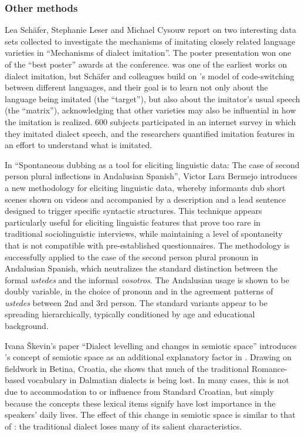 \documentclass[output=paper]{LSP/langsci}
\begin{document}
\subsubsection{Other methods}
Lea Schäfer, Stephanie Leser and Michael Cysouw report on two interesting data sets collected to investigate the mechanisms of imitating closely related language varieties in “Mechanisms of dialect imitation”. The poster presentation won one of the “best poster” awards at the conference. \citet{purschke_regionalsprache_2011} was one of the earliest works on dialect imitation, but Schäfer and colleagues build on \citeauthor{myers-scotton_duelling_1993}'s \citeyearpar{myers-scotton_duelling_1993} model of code-switching between different languages, and their goal is to learn not only about the language being imitated (the “target”), but also about the imitator’s usual speech (the “matrix”), acknowledging that other varieties may also be influential in how the imitation is realized. 600 subjects participated in an internet survey in which they imitated dialect speech, and the researchers quantified imitation features in an effort to understand what is imitated.

In “Spontaneous dubbing as a tool for eliciting linguistic data: The case of second person plural inflections in Andalusian Spanish”, Victor Lara Bermejo introduces a new methodology for eliciting linguistic data, whereby informants dub short scenes shown on videos and accompanied by a description and a lead sentence designed to trigger specific syntactic structures. This technique appears particularly useful for eliciting linguistic features that prove too rare in traditional sociolinguistic interviews, while maintaining a level of spontaneity that is not compatible with pre-established questionnaires. The methodology is successfully applied to the case of the second person plural pronoun in Andalusian Spanish, which neutralizes the standard distinction between the formal \textit{ustedes} and the informal \textit{vosotros}. The Andalusian usage is shown to be doubly variable, in the choice of pronoun and in the agreement patterns of \textit{ustedes} between 2nd and 3rd person. The standard variants appear to be spreading hierarchically, typically conditioned by age and educational background. 

Ivana Škevin’s paper “Dialect levelling and changes in semiotic space” introduces \citeauthor{lotman_semiosphere_1985}’s \citeyearpar{lotman_semiosphere_1985} concept of semiotic space as an additional explanatory factor in . Drawing on fieldwork in Betina, Croatia, she shows that much of the traditional Romance-based vocabulary in Dalmatian dialects is being lost. In many cases, this is not due to accommodation to or influence from Standard Croatian, but simply because the concepts these lexical items signify have lost importance in the speakers’ daily lives. The effect of this change in semiotic space is similar to that of : the traditional dialect loses many of its salient characteristics.
\end{document}
